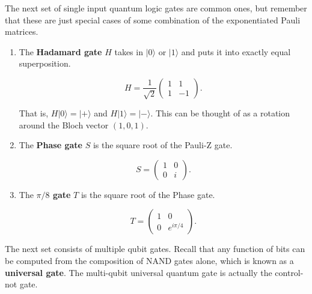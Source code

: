 \documentclass{article}
\theoremstyle{definition}
\begin{document}
    The next set of single input quantum logic gates are common ones, but remember that these are just special cases of some combination of the exponentiated Pauli matrices.

    \begin{enumerate}
      \item The \textbf{Hadamard gate} $H$ takes in $|0\rangle$ or $|1\rangle$ and puts it into exactly equal superposition.

        \[H = \frac{1}{\sqrt{2}} \begin{pmatrix} 1 & 1 \\ 1 & -1 \end{pmatrix}.\]

      That is, $H|0\rangle = |+\rangle$ and $H|1\rangle = |-\rangle$. This can be thought of as a rotation around the Bloch vector $(1, 0, 1)$.

      \item The \textbf{Phase gate} $S$ is the square root of the Pauli-Z gate.

        \[S = \begin{pmatrix} 1 & 0 \\ 0 & i \end{pmatrix}.\]

      \item The \textbf{$\pi/8$ gate} $T$ is the square root of the Phase gate.

        \[T = \begin{pmatrix} 1 & 0 \\ 0 & e^{i \pi/4} \end{pmatrix}.\]
    \end{enumerate}

    The next set consists of multiple qubit gates. Recall that any function of bits can be computed from the composition of NAND gates alone, which is known as a \textbf{universal gate}. The multi-qubit universal quantum gate is actually the control-not gate.
\end{document}
